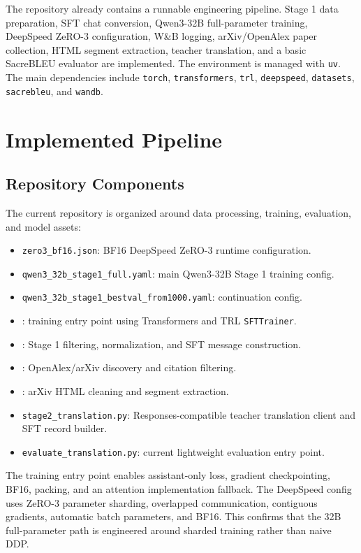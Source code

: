 \documentclass{article}
\begin{document}
The repository already contains a runnable engineering pipeline. Stage 1 data preparation, SFT chat conversion, Qwen3-32B full-parameter training, DeepSpeed ZeRO-3 configuration, W\&B logging, arXiv/OpenAlex paper collection, HTML segment extraction, teacher translation, and a basic SacreBLEU evaluator are implemented. The environment is managed with \texttt{uv}. The main dependencies include \texttt{torch}, \texttt{transformers}, \texttt{trl}, \texttt{deepspeed}, \texttt{datasets}, \texttt{sacrebleu}, and \texttt{wandb}.

\section{Implemented Pipeline}

\subsection{Repository Components}

The current repository is organized around data processing, training, evaluation, and model assets:

\begin{itemize}
    \item \texttt{zero3\_bf16.json}: BF16 DeepSpeed ZeRO-3 runtime configuration.
    \item \texttt{qwen3\_32b\_stage1\_full.yaml}: main Qwen3-32B Stage 1 training config.
    \item \texttt{qwen3\_32b\_stage1\_bestval\_from1000.yaml}: continuation config.
    \item {}: training entry point using Transformers and TRL \texttt{SFTTrainer}.
    \item {}: Stage 1 filtering, normalization, and SFT message construction.
    \item {}: OpenAlex/arXiv discovery and citation filtering.
    \item {}: arXiv HTML cleaning and segment extraction.
    \item \texttt{stage2\_translation.py}: Responses-compatible teacher translation client and SFT record builder.
    \item \texttt{evaluate\_translation.py}: current lightweight evaluation entry point.
\end{itemize}

The training entry point enables assistant-only loss, gradient checkpointing, BF16, packing, and an attention implementation fallback. The DeepSpeed config uses ZeRO-3 parameter sharding, overlapped communication, contiguous gradients, automatic batch parameters, and BF16. This confirms that the 32B full-parameter path is engineered around sharded training rather than naive DDP.
\end{document}
